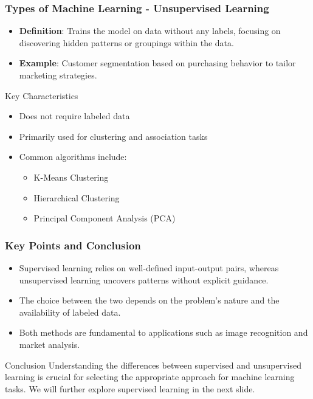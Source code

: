 \documentclass[aspectratio=169]{beamer}
\begin{document}
\begin{frame}[fragile]
    \frametitle{Types of Machine Learning - Unsupervised Learning}
    \begin{itemize}
        \item \textbf{Definition}: Trains the model on data without any labels, focusing on discovering hidden patterns or groupings within the data.
        \item \textbf{Example}: Customer segmentation based on purchasing behavior to tailor marketing strategies.
    \end{itemize}

    \begin{block}{Key Characteristics}
        \begin{itemize}
            \item Does not require labeled data
            \item Primarily used for clustering and association tasks
            \item Common algorithms include:
            \begin{itemize}
                \item K-Means Clustering
                \item Hierarchical Clustering
                \item Principal Component Analysis (PCA)
            \end{itemize}
        \end{itemize}
    \end{block}
\end{frame}

\begin{frame}[fragile]
    \frametitle{Key Points and Conclusion}
    \begin{itemize}
        \item Supervised learning relies on well-defined input-output pairs, whereas unsupervised learning uncovers patterns without explicit guidance.
        \item The choice between the two depends on the problem's nature and the availability of labeled data.
        \item Both methods are fundamental to applications such as image recognition and market analysis.
    \end{itemize}

    \begin{block}{Conclusion}
        Understanding the differences between supervised and unsupervised learning is crucial for selecting the appropriate approach for machine learning tasks. 
        We will further explore supervised learning in the next slide.
    \end{block}
\end{frame}
\end{document}

